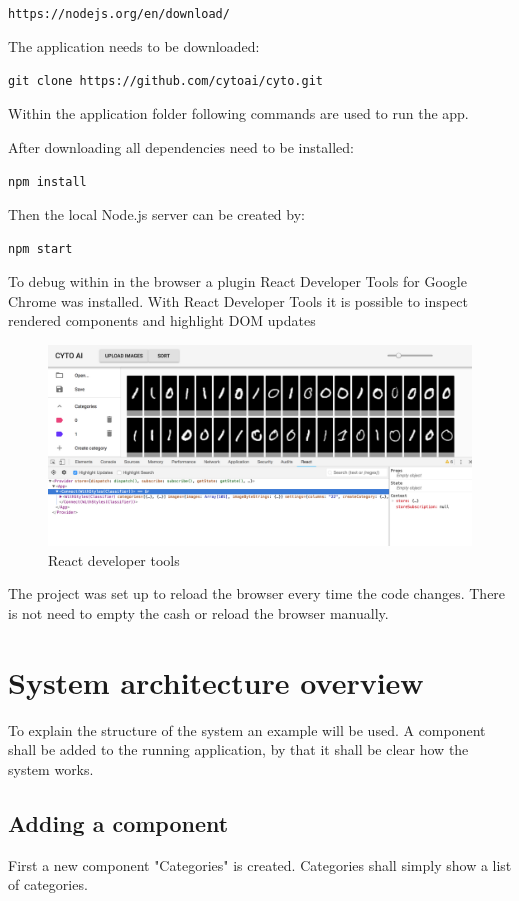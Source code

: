 \texttt{https://nodejs.org/en/download/}

The application needs to be downloaded:

\texttt{git clone https://github.com/cytoai/cyto.git}

Within the application folder following commands are used to
run the app.

After downloading all dependencies need to be installed:

\texttt{npm install}

Then the local Node.js server can be created by:

\texttt{npm start}

To debug within in the browser a plugin React Developer Tools
for Google Chrome was installed. With React Developer Tools
it is possible to inspect rendered components and highlight DOM updates 

\begin{figure}[H]
	\centering
	\includegraphics[width=0.9\linewidth]{bilder/cyto/ReactDebug.png}
	\caption{React developer tools}
	\label{fig:Developer Tools}
\end{figure}

The project was set up to reload the browser every time 
the code changes. There is not need to empty the cash or reload the browser manually.


\section{System architecture overview}

To explain the structure of the system an example will be used. A component shall be added to the running application,
by that it shall be clear how the system works.

\subsection{Adding a component}
First a new component "Categories" is created. Categories shall simply show a list of categories. 

